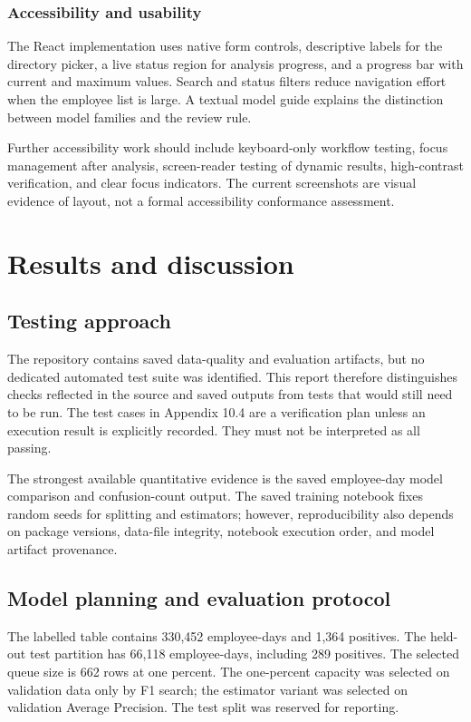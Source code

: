 \subsection{Accessibility and usability}
The React implementation uses native form controls, descriptive labels
for the directory picker, a live status region for analysis progress,
and a progress bar with current and maximum values. Search and status
filters reduce navigation effort when the employee list is large. A
textual model guide explains the distinction between model families
and the review rule.

Further accessibility work should include keyboard-only workflow
testing, focus management after analysis, screen-reader testing of
dynamic results, high-contrast verification, and clear focus
indicators. The current screenshots are visual evidence of layout,
not a formal accessibility conformance assessment.

\chapter{Results and discussion}
\label{chap:results}

\section{Testing approach}
The repository contains saved data-quality and evaluation artifacts,
but no dedicated automated test suite was identified. This report
therefore distinguishes checks reflected in the source and saved
outputs from tests that would still need to be run. The test cases in
Appendix 10.4 are a verification plan unless an execution result is
explicitly recorded. They must not be interpreted as all passing.

The strongest available quantitative evidence is the saved
employee-day model comparison and confusion-count output. The saved
training notebook fixes random seeds for splitting and estimators;
however, reproducibility also depends on package versions, data-file
integrity, notebook execution order, and model artifact provenance.

\section{Model planning and evaluation protocol}
The labelled table contains 330,452 employee-days and 1,364 positives.
The held-out test partition has 66,118 employee-days, including 289
positives. The selected queue size is 662 rows at one percent. The
one-percent capacity was selected on validation data only by F1 search;
the estimator variant was selected on validation Average Precision.
The test split was reserved for reporting.

